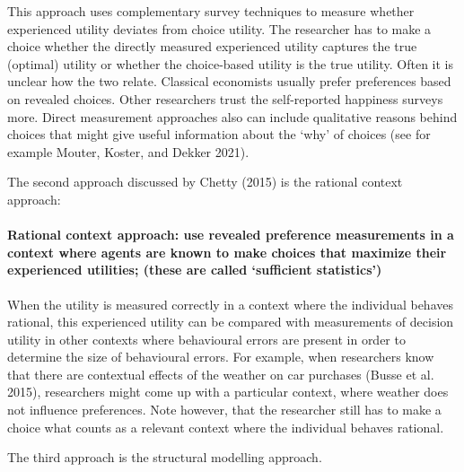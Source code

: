 \documentclass[
]{book}
\begin{document}
This approach uses complementary survey techniques to measure whether experienced utility deviates from choice utility. The researcher has to make a choice whether the directly measured experienced utility captures the true (optimal) utility or whether the choice-based utility is the true utility. Often it is unclear how the two relate. Classical economists usually prefer preferences based on revealed choices. Other researchers trust the self-reported happiness surveys more. Direct measurement approaches also can include qualitative reasons behind choices that might give useful information about the `why' of choices (see for example Mouter, Koster, and Dekker 2021).

The second approach discussed by Chetty (2015) is the rational context approach:

\hypertarget{rational-context-approach-use-revealed-preference-measurements-in-a-context-where-agents-are-known-to-make-choices-that-maximize-their-experienced-utilities-these-are-called-sufficient-statistics}{%
\paragraph{\texorpdfstring{\textbf{Rational context approach}: use revealed preference measurements in a context where agents are known to make choices that maximize their experienced utilities; (these are called `sufficient statistics')}{Rational context approach: use revealed preference measurements in a context where agents are known to make choices that maximize their experienced utilities; (these are called `sufficient statistics')}}\label{rational-context-approach-use-revealed-preference-measurements-in-a-context-where-agents-are-known-to-make-choices-that-maximize-their-experienced-utilities-these-are-called-sufficient-statistics}}

When the utility is measured correctly in a context where the individual behaves rational, this experienced utility can be compared with measurements of decision utility in other contexts where behavioural errors are present in order to determine the size of behavioural errors. For example, when researchers know that there are contextual effects of the weather on car purchases (Busse et al. 2015), researchers might come up with a particular context, where weather does not influence preferences. Note however, that the researcher still has to make a choice what counts as a relevant context where the individual behaves rational.

The third approach is the structural modelling approach.
\end{document}
